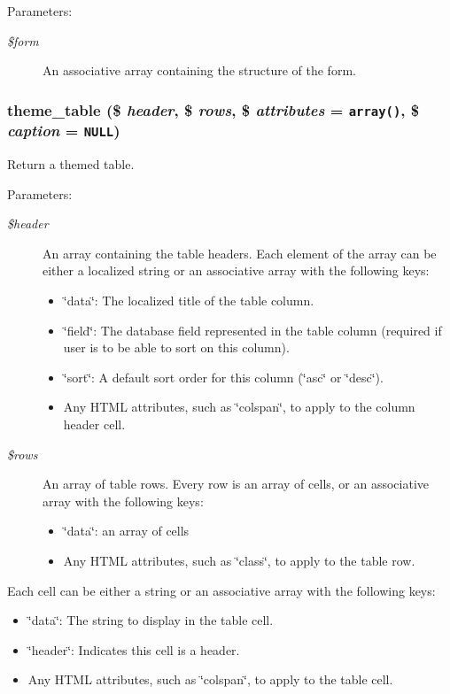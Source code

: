 \begin{Desc}
\item[Parameters:]
\begin{description}
\item[{\em \$form}]An associative array containing the structure of the form. \end{description}
\end{Desc}
\hypertarget{group__themeable_g77f053aaa73bbeaa3943bf8f06ce625d}{
\subsubsection[{theme\_\-table}]{\setlength{\rightskip}{0pt plus 5cm}theme\_\-table (\$ {\em header}, \/  \$ {\em rows}, \/  \$ {\em attributes} = {\tt array()}, \/  \$ {\em caption} = {\tt NULL})}}
\label{group__themeable_g77f053aaa73bbeaa3943bf8f06ce625d}


Return a themed table.

\begin{Desc}
\item[Parameters:]
\begin{description}
\item[{\em \$header}]An array containing the table headers. Each element of the array can be either a localized string or an associative array with the following keys:\begin{itemize}
\item \char`\"{}data\char`\"{}: The localized title of the table column.\item \char`\"{}field\char`\"{}: The database field represented in the table column (required if user is to be able to sort on this column).\item \char`\"{}sort\char`\"{}: A default sort order for this column (\char`\"{}asc\char`\"{} or \char`\"{}desc\char`\"{}).\item Any HTML attributes, such as \char`\"{}colspan\char`\"{}, to apply to the column header cell. \end{itemize}
\item[{\em \$rows}]An array of table rows. Every row is an array of cells, or an associative array with the following keys:\begin{itemize}
\item \char`\"{}data\char`\"{}: an array of cells\item Any HTML attributes, such as \char`\"{}class\char`\"{}, to apply to the table row.\end{itemize}
\end{description}
\end{Desc}
Each cell can be either a string or an associative array with the following keys:\begin{itemize}
\item \char`\"{}data\char`\"{}: The string to display in the table cell.\item \char`\"{}header\char`\"{}: Indicates this cell is a header.\item Any HTML attributes, such as \char`\"{}colspan\char`\"{}, to apply to the table cell.\end{itemize}


